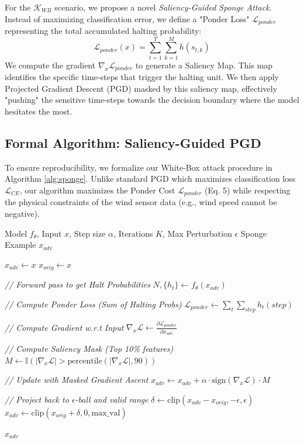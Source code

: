 For the $\mathcal{K}_{WB}$ scenario, we propose a novel \textit{Saliency-Guided Sponge Attack}. Instead of maximizing classification error, we define a "Ponder Loss" $\mathcal{L}_{ponder}$ representing the total accumulated halting probability:
\begin{equation}
    \mathcal{L}_{ponder}(x) = \sum_{t=1}^{T} \sum_{k=1}^{M} h(s_{t,k})
\end{equation}
We compute the gradient $\nabla_x \mathcal{L}_{ponder}$ to generate a Saliency Map. This map identifies the specific time-steps that trigger the halting unit. We then apply Projected Gradient Descent (PGD) masked by this saliency map, effectively "pushing" the sensitive time-steps towards the decision boundary where the model hesitates the most.

\subsection{Formal Algorithm: Saliency-Guided PGD}
To ensure reproducibility, we formalize our White-Box attack procedure in Algorithm \ref{alg:sponge}. Unlike standard PGD which maximizes classification loss $\mathcal{L}_{CE}$, our algorithm maximizes the Ponder Cost $\mathcal{L}_{ponder}$ (Eq. 5) while respecting the physical constraints of the wind sensor data (e.g., wind speed cannot be negative).

\begin{algorithm}[h]
\caption{Saliency-Guided Sponge Attack (PGD)}
\label{alg:sponge}
\begin{algorithmic}[1]
\Require Model $f_\theta$, Input $x$, Step size $\alpha$, Iterations $K$, Max Perturbation $\epsilon$
\Ensure Sponge Example $x_{adv}$

\State $x_{adv} \leftarrow x$
\State $x_{orig} \leftarrow x$

    \State \textit{// Forward pass to get Halt Probabilities}
    \State $N, \{h_t\} \leftarrow f_\theta(x_{adv})$

    \State \textit{// Compute Ponder Loss (Sum of Halting Probs)}
    \State $\mathcal{L}_{ponder} \leftarrow \sum_{t} \sum_{step} h_t(step)$

    \State \textit{// Compute Gradient w.r.t Input}
    \State $\nabla_x \mathcal{L} \leftarrow \frac{\partial \mathcal{L}_{ponder}}{\partial x_{adv}}$

    \State \textit{// Compute Saliency Mask (Top 10\% features)}
    \State $M \leftarrow \mathbb{I}(|\nabla_x \mathcal{L}| > \text{percentile}(|\nabla_x \mathcal{L}|, 90))$

    \State \textit{// Update with Masked Gradient Ascent}
    \State $x_{adv} \leftarrow x_{adv} + \alpha \cdot \text{sign}(\nabla_x \mathcal{L}) \cdot M$

    \State \textit{// Project back to $\epsilon$-ball and valid range}
    \State $\delta \leftarrow \text{clip}(x_{adv} - x_{orig}, -\epsilon, \epsilon)$
    \State $x_{adv} \leftarrow \text{clip}(x_{orig} + \delta, 0, \text{max\_val})$
\EndFor

\State \Return $x_{adv}$
\end{algorithmic}
\end{algorithm}

